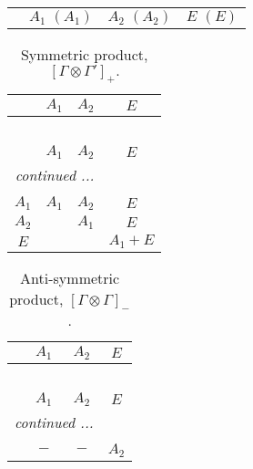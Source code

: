 \documentclass[fleqn,10pt,landscape]{article}
\begin{document}
\begin{itemize}
\begin{center}
\begin{longtable}{cccc}
 & $ A_{1}\,\,(A_{1}) $ & $ A_{2}\,\,(A_{2}) $ & $ E\,\,(E) $ \\
\end{longtable}
\end{center}
\begin{center}
\renewcommand{\arraystretch}{1.0}
\begin{longtable}{c|ccc}
\caption{Symmetric product, $[\Gamma\otimes\Gamma']_+.$}
 \\
 \hline \hline
 & $ A_{1} $ & $ A_{2} $ & $ E $ \\ \hline \endfirsthead

\multicolumn{3}{l}{\tablename\ \thetable{}} \\
 \hline \hline
 & $ A_{1} $ & $ A_{2} $ & $ E $ \\ \hline \endhead

 \hline \hline
\multicolumn{3}{r}{\footnotesize\it continued ...} \\ \endfoot

 \hline \hline
\multicolumn{3}{r}{} \\ \endlastfoot

$ A_{1} $ & $ A_{1} $ & $ A_{2} $ & $ E $ \\
$ A_{2} $ & $  $ & $ A_{1} $ & $ E $ \\
$ E $ & $  $ & $  $ & $ A_{1} + E $ \\
\end{longtable}
\end{center}
\begin{center}
\renewcommand{\arraystretch}{1.0}
\begin{longtable}{cccc}
\caption{Anti-symmetric product, $[\Gamma\otimes\Gamma]_-$.}
 \\
 \hline \hline
 & $ A_{1} $ & $ A_{2} $ & $ E $ \\ \hline \endfirsthead

\multicolumn{3}{l}{\tablename\ \thetable{}} \\
 \hline \hline
 & $ A_{1} $ & $ A_{2} $ & $ E $ \\ \hline \endhead

 \hline \hline
\multicolumn{3}{r}{\footnotesize\it continued ...} \\ \endfoot

 \hline \hline
\multicolumn{3}{r}{} \\ \endlastfoot

$  $ & $ - $ & $ - $ & $ A_{2} $ \\
\end{longtable}
\end{center}


\end{itemize}
\end{document}
